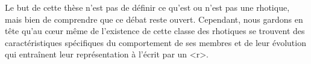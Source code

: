 
Le but de cette thèse n'est pas de définir ce qu'est ou n'est pas une rhotique, mais bien de comprendre que ce débat reste ouvert. Cependant, nous gardons en tête qu'au cœur même de l'existence de cette classe des rhotiques se trouvent des caractéristiques spécifiques du comportement de ses membres et de leur évolution qui entraînent leur représentation à l'écrit par un <r>.
